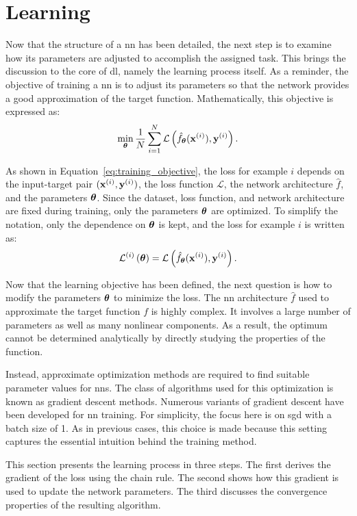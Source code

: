 \section{Learning}\label{sec:deep_learning_learning}

Now that the structure of a \gls{nn} has been detailed, the next step is to examine how its parameters are adjusted to accomplish the assigned task.
This brings the discussion to the core of \gls{dl}, namely the learning process itself.
As a reminder, the objective of training a \gls{nn} is to adjust its parameters so that the network provides a good approximation of the target function.
Mathematically, this objective is expressed as:
\begin{equation}
\min_{\boldsymbol{\theta}} \frac{1}{N} \sum_{i=1}^{N} \mathcal{L}\left(\hat{f}_{\boldsymbol{\theta}}(\mathbf{x}^{(i)}), \mathbf{y}^{(i)}\right).
\label{eq:training_objective}
\end{equation}

As shown in Equation~\eqref{eq:training_objective}, the loss for example $i$ depends on the input-target pair $(\mathbf{x}^{(i)},\mathbf{y}^{(i)})$, the loss function $\mathcal{L}$, the network architecture $\hat{f}$, and the parameters $\boldsymbol{\theta}$.
Since the dataset, loss function, and network architecture are fixed during training, only the parameters $\boldsymbol{\theta}$ are optimized.
To simplify the notation, only the dependence on $\boldsymbol{\theta}$ is kept, and the loss for example $i$ is written as:
\begin{equation}
\mathcal{L}^{(i)}\left(\boldsymbol{\theta}\right) = \mathcal{L}\left(\hat{f}_{\boldsymbol{\theta}}(\mathbf{x}^{(i)}), \mathbf{y}^{(i)}\right).
\end{equation}

Now that the learning objective has been defined, the next question is how to modify the parameters $\boldsymbol{\theta}$ to minimize the loss.
The \gls{nn} architecture $\hat{f}$ used to approximate the target function $f$ is highly complex.
It involves a large number of parameters as well as many nonlinear components.
As a result, the optimum cannot be determined analytically by directly studying the properties of the function.

Instead, approximate optimization methods are required to find suitable parameter values for \glspl{nn}.
The class of algorithms used for this optimization is known as gradient descent methods.
Numerous variants of gradient descent have been developed for \gls{nn} training.
For simplicity, the focus here is on \gls{sgd} with a batch size of 1.
As in previous cases, this choice is made because this setting captures the essential intuition behind the training method.

This section presents the learning process in three steps.
The first derives the gradient of the loss using the chain rule.
The second shows how this gradient is used to update the network parameters.
The third discusses the convergence properties of the resulting algorithm.

